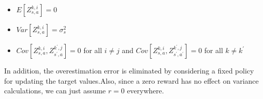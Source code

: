 \begin{itemize}
    \item \begin{math}E[Z^{k,i}_{s,a}]=0\end{math}
    \item \begin{math}Var[Z^{k,i}_{s,a}]=\sigma ^2_s\end{math}
    \item \begin{math}Cov[Z^{k,i}_{s,a},Z^{k^{'},j}_{s^{'},a}]=0\end{math} for all \begin{math}i\neq j\end{math}
and \begin{math}Cov[Z^{k,i}_{s,a},Z^{k^{'},j}_{s^{'},a^{'}}]=0\end{math} for all \begin{math}k\neq k^'\end{math}
\end{itemize}
In addition, the overestimation error is eliminated by considering a fixed policy for updating the target values.Also, since a zero reward has no effect on variance calculations, we can just assume \begin{math}r=0\end{math}
everywhere.

\iffalse
Please present the formulation in this section. You may want to cover the following aspects:
\begin{itemize}
    \item Your notations (e.g. MDPs, value functions, function approximators,...etc)
    \item The optimization problem of interest
    \item The technical assumptions
\end{itemize}
\fi